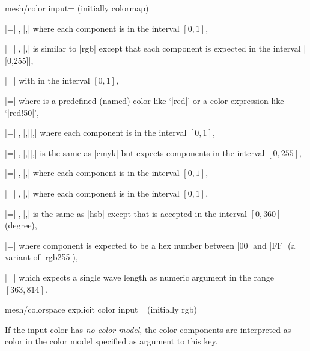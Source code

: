 {{\begin{pgfplotskey}{mesh/color input= (initially colormap)}
\begin{description}
\renewcommand\makelabel[1]{\declaretext{#1}}%
\setlength{\labelsep}{0pt}
\item[rgb]|=||,||,| where each component is in the interval $[0,1]$,
\item[rgb255]|=||,||,| is similar to |rgb| except that each component is expected in the interval |[0,255]|,
\item[gray]|=| with  in the interval $[0,1]$,
\item[color]|=| where  is a predefined (named) color like `|red|' or a color expression like `|red!50|',
\item[cmyk]|=||,||,||,| where each component is in the interval $[0,1]$,
\item[cmyk255]|=||,||,||,| is the same as |cmyk| but expects components in the interval $[0,255]$,
\item[cmy]|=||,||,| where each component is in the interval $[0,1]$,
\item[hsb]|=||,||,| where each component is in the interval $[0,1]$,
\item[Hsb]|=||,||,| is the same as |hsb| except that  is accepted in the interval $[0,360]$ (degree),
\item[HTML]|=| where component is expected to be a hex number between |00| and |FF| (a variant of |rgb255|),
\item[wave]|=| which expects a single wave length as numeric argument in the range $[363,814]$.
\end{description}

\begin{pgfplotskey}{%
	mesh/colorspace explicit color input= (initially rgb)%
}

	If the input color has \emph{no color model}, the color components are interpreted as color in the color model specified as argument to this key.


\end{pgfplotskey}
\end{pgfplotskey}}}
